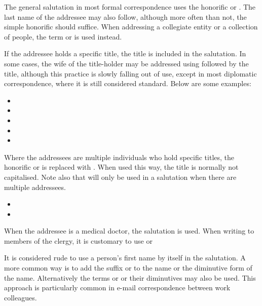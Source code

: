 The general salutation in most formal correspondence uses the honorific
 or . The last name of the addressee may also
follow, although more often than not, the simple honorific
should suffice. When addressing a collegiate entity or a collection of people,
the term  or  is used instead.

If the addressee holds a specific title, the title is included in the
salutation. In some cases, the wife of the title-holder may be addressed using
 followed by the title, although this practice is slowly falling out of
use, except in most diplomatic correspondence, where it is still considered
standard. Below are some examples:


\begin{itemize}[nosep]
	\item {}
	\item {}
	\item {}
	\item {}
	\item {}
\end{itemize}

Where the addressees are multiple individuals who hold specific titles, the
honorific  or  is replaced with . When used this way, the title is normally not capitalised. Note
also that  will only be used in a salutation when there are
multiple addressees.

\begin{itemize}[nosep]
	\item {}
	\item {}
\end{itemize}

When the addressee is a medical doctor, the salutation  is
used. When writing to members of the clergy, it is customary to use
 or 

It is considered rude to use a person's first name by itself in the salutation.
A more common way is to add the suffix  or  to
the name or the diminutive form of the name. Alternatively the terms
 or  or their diminutives
may also be used. This approach is particularly common in e-mail correspondence
between work colleagues.

